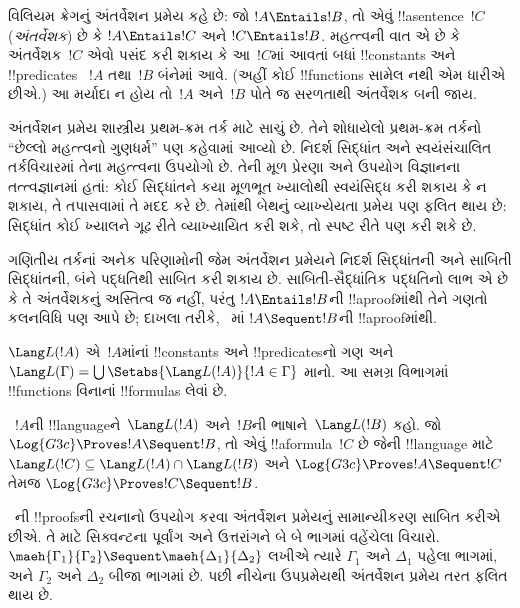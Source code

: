 \documentclass[../../../include/open-logic-section]{subfiles}
\begin{document}


વિલિયમ ક્રેગનું અંતર્વેશન પ્રમેય કહે છે:
જો $!A \Entails !B$, તો એવું
!!a{sentence}~$!C$ (\emph{અંતર્વેશક}) છે કે
$!A \Entails !C$ અને $!C \Entails !B$.
મહત્ત્વની વાત એ છે કે અંતર્વેશક~$!C$
એવો પસંદ કરી શકાય કે આ~$!C$માં આવતાં
બધાં !!{constant}s અને !!{predicate}s
~$!A$ તથા~$!B$ બંનેમાં આવે.
(અહીં કોઈ !!{function}s સામેલ નથી એમ ધારીએ છીએ.)
આ મર્યાદા ન હોય તો~$!A$ અને~$!B$
પોતે જ સરળતાથી અંતર્વેશક બની જાય.

અંતર્વેશન પ્રમેય શાસ્ત્રીય પ્રથમ-ક્રમ
તર્ક માટે સાચું છે. તેને શોધાયેલો
પ્રથમ-ક્રમ તર્કનો ``છેલ્લો મહત્ત્વનો ગુણધર્મ''
પણ કહેવામાં આવ્યો છે.
નિદર્શ સિદ્ધાંત અને સ્વયંસંચાલિત
તર્કવિચારમાં તેના મહત્ત્વના ઉપયોગો છે.
તેની મૂળ પ્રેરણા અને ઉપયોગ વિજ્ઞાનના
તત્ત્વજ્ઞાનમાં હતાં: કોઈ સિદ્ધાંતને
કયા મૂળભૂત ખ્યાલોથી સ્વયંસિદ્ધ કરી શકાય
કે ન શકાય, તે તપાસવામાં તે મદદ કરે છે.
તેમાંથી બેથનું વ્યાખ્યેયતા પ્રમેય પણ
ફલિત થાય છે: સિદ્ધાંત કોઈ ખ્યાલને
ગૂઢ રીતે વ્યાખ્યાયિત કરી શકે,
તો સ્પષ્ટ રીતે પણ કરી શકે છે.

ગણિતીય તર્કનાં અનેક પરિણામોની જેમ
અંતર્વેશન પ્રમેયને નિદર્શ સિદ્ધાંતની
અને સાબિતી સિદ્ધાંતની, બંને પદ્ધતિથી
સાબિત કરી શકાય છે.
સાબિતી-સૈદ્ધાંતિક પદ્ધતિનો લાભ એ છે કે
તે અંતર્વેશકનું અસ્તિત્વ જ નહીં,
પરંતુ $!A \Entails !B$ની
!!a{proof}માંથી તેને ગણતો કલનવિધિ
પણ આપે છે; દાખલા તરીકે,
~માં
$!A \Sequent !B$ની !!a{proof}માંથી.

$\Lang L(!A)$ એ~$!A$માંનાં
!!{constant}s અને !!{predicate}sનો ગણ
અને
$\Lang L(\Gamma) = \bigcup \Setabs{\Lang L(!A)}{!A \in
\Gamma}$ માનો. આ સમગ્ર વિભાગમાં
!!{function}s વિનાનાં !!{formula}s
લેવાં છે.

\begin{thm}[ક્રેગનું અંતર્વેશન પ્રમેય]
~$!A$ની !!{language}ને~$\Lang L(!A)$
અને~$!B$ની ભાષાને~$\Lang L(!B)$ કહો.
જો $\Log{G3c} \Proves !A \Sequent !B$,
તો એવું !!a{formula}~$!C$ છે
જેની !!{language} માટે
$\Lang L(!C) \subseteq \Lang
L(!A) \cap \Lang L(!B)$ અને
$\Log{G3c} \Proves !A \Sequent !C$
તેમજ
$\Log{G3c} \Proves !C \Sequent !B$.
\end{thm}

~ની !!{proof}sની રચનાનો
ઉપયોગ કરવા અંતર્વેશન પ્રમેયનું
સામાન્યીકરણ સાબિત કરીએ છીએ.
તે માટે સિક્વન્ટના પૂર્વાંગ અને
ઉત્તરાંગને બે બે ભાગમાં વહેંચેલા
વિચારો. $\maeh{\Gamma_1}{\Gamma_2} \Sequent
\maeh{\Delta_1}{\Delta_2}$ લખીએ ત્યારે
$\Gamma_1$ અને $\Delta_1$ પહેલા ભાગમાં,
અને $\Gamma_2$ અને $\Delta_2$
બીજા ભાગમાં છે. પછી નીચેના ઉપપ્રમેયથી
અંતર્વેશન પ્રમેય તરત ફલિત થાય છે.
\end{document}

